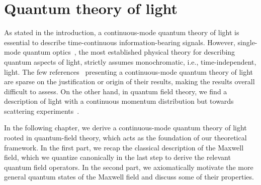 \chapter{Quantum theory of light}\label{ch:light}

As stated in the introduction, a continuous-mode quantum theory of light is essential to describe time-continuous information-bearing signals.
However, single-mode quantum optics~\cite{Fox2006,Gerry2005,Haroche2006,Meystre2007}, the most established physical theory for describing quantum aspects of light, strictly assumes monochromatic, i.e., time-independent, light.
The few references~\cite{Barnett2002,Loudon2000} presenting a continuous-mode quantum theory of light are sparse on the justification or origin of their results, making the results overall difficult to assess.
On the other hand, in quantum field theory, we find a description of light with a continuous momentum distribution but towards scattering experiments~\cite{Itzykson2012,Greiner2013,Srednicki2007,Peskin1995}.

In the following chapter, we derive a continuous-mode quantum theory of light rooted in quantum-field theory, which acts as the foundation of our theoretical framework.
In the first part, we recap the classical description of the Maxwell field, which we quantize canonically in the last step to derive the relevant quantum field operators.
In the second part, we axiomatically motivate the more general quantum states of the Maxwell field and discuss some of their properties.